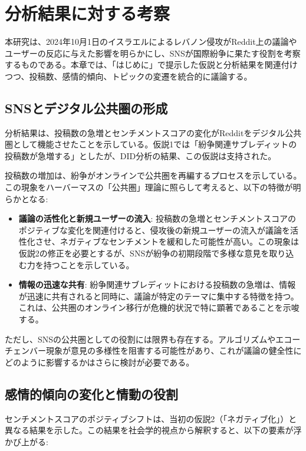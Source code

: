 \documentclass[11pt, a4j]{jreport}
\begin{document}
    \section{分析結果に対する考察}

    本研究は、2024年10月1日のイスラエルによるレバノン侵攻がReddit上の議論やユーザーの反応に与えた影響を明らかにし、SNSが国際紛争に果たす役割を考察するものである。本章では、「はじめに」で提示した仮説と分析結果を関連付けつつ、投稿数、感情的傾向、トピックの変遷を統合的に議論する。

    \subsection{SNSとデジタル公共圏の形成}
    分析結果は、投稿数の急増とセンチメントスコアの変化がRedditをデジタル公共圏として機能させたことを示している。仮説1では「紛争関連サブレディットの投稿数が急増する」としたが、DID分析の結果、この仮説は支持された。

    投稿数の増加は、紛争がオンラインで公共圏を再編するプロセスを示している。この現象をハーバーマスの「公共圏」理論\cite{habermas1989structural}に照らして考えると、以下の特徴が明らかとなる:

    \begin{itemize}
        \item \textbf{議論の活性化と新規ユーザーの流入}: 投稿数の急増とセンチメントスコアのポジティブな変化を関連付けると、侵攻後の新規ユーザーの流入が議論を活性化させ、ネガティブなセンチメントを緩和した可能性が高い。この現象は仮説2の修正を必要とするが、SNSが紛争の初期段階で多様な意見を取り込む力を持つことを示している。
        \item \textbf{情報の迅速な共有}: 紛争関連サブレディットにおける投稿数の急増は、情報が迅速に共有されると同時に、議論が特定のテーマに集中する特徴を持つ。これは、公共圏のオンライン移行が危機的状況で特に顕著であることを示唆する。
    \end{itemize}

    ただし、SNSの公共圏としての役割には限界も存在する。アルゴリズムやエコーチェンバー現象\cite{pariser2011filter}が意見の多様性を阻害する可能性があり、これが議論の健全性にどのように影響するかはさらに検討が必要である。

    \subsection{感情的傾向の変化と情動の役割}
    センチメントスコアのポジティブシフトは、当初の仮説2（「ネガティブ化」）と異なる結果を示した。この結果を社会学的視点から解釈すると、以下の要素が浮かび上がる:
\end{document}

